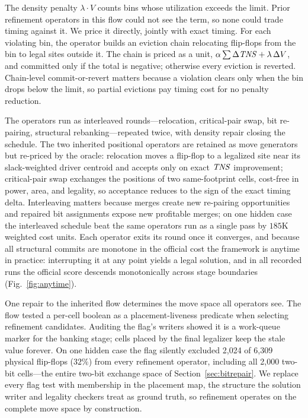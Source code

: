 The density penalty $\lambda \cdot V$ counts bins whose utilization exceeds the limit. Prior refinement operators in this flow could not see the term, so none could trade timing against it. We price it directly, jointly with exact timing. For each violating bin, the operator builds an eviction chain relocating flip-flops from the bin to legal sites outside it. The chain is priced as a unit, $\alpha \sum \Delta\mathit{TNS} + \lambda\,\Delta V$, and committed only if the total is negative; otherwise every eviction is reverted. Chain-level commit-or-revert matters because a violation clears only when the bin drops below the limit, so partial evictions pay timing cost for no penalty reduction.

The operators run as interleaved rounds---relocation, critical-pair swap, bit re-pairing, structural rebanking---repeated twice, with density repair closing the schedule. The two inherited positional operators are retained as move generators but re-priced by the oracle: relocation moves a flip-flop to a legalized site near its slack-weighted driver centroid and accepts only on exact $\mathit{TNS}$ improvement; critical-pair swap exchanges the positions of two same-footprint cells, cost-free in power, area, and legality, so acceptance reduces to the sign of the exact timing delta. Interleaving matters because merges create new re-pairing opportunities and repaired bit assignments expose new profitable merges; on one hidden case the interleaved schedule beat the same operators run as a single pass by $185$K weighted cost units. Each operator exits its round once it converges, and because all structural commits are monotone in the official cost the framework is anytime in practice: interrupting it at any point yields a legal solution, and in all recorded runs the official score descends monotonically across stage boundaries (Fig.~\ref{fig:anytime}).

One repair to the inherited flow determines the move space all operators see. The flow tested a per-cell boolean as a placement-liveness predicate when selecting refinement candidates. Auditing the flag's writers showed it is a work-queue marker for the banking stage; cells placed by the final legalizer keep the stale value forever. On one hidden case the flag silently excluded 2{,}024 of 6{,}309 physical flip-flops ($32\%$) from every refinement operator, including all 2{,}000 two-bit cells---the entire two-bit exchange space of Section~\ref{sec:bitrepair}. We replace every flag test with membership in the placement map, the structure the solution writer and legality checkers treat as ground truth, so refinement operates on the complete move space by construction.

